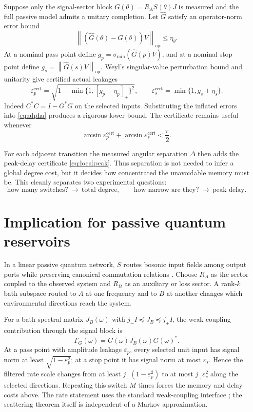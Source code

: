 \documentclass[11pt]{article}
\theoremstyle{definition}
\theoremstyle{remark}
\newcommand{\onorm}[1]{\left\lVert#1\right\rVert_{\mathrm{op}}}
\begin{document}
Suppose only the signal-sector block
$G(\theta)=R_AS(\theta)J$ is measured and the full passive model admits a
unitary completion.  Let $\widehat G$ satisfy an operator-norm error bound
\begin{equation}\label{eq:measurementerror}
 \onorm{(\widehat G(\theta)-G(\theta))V}\leq\eta_\theta.
\end{equation}
At a nominal pass point define
$g_p=\sigma_{\min}(\widehat G(p)V)$, and at a nominal stop point define
$g_s=\onorm{\widehat G(s)V}$.  Weyl's singular-value perturbation bound and
unitarity give certified actual leakages
\begin{equation}\label{eq:inflatederrors}
 \varepsilon_p^{\mathrm{cert}}
 =\sqrt{1-\min\{1,[g_p-\eta_p]_+\}^2},
 \qquad
 \varepsilon_s^{\mathrm{cert}}
 =\min\{1,g_s+\eta_s\}.
\end{equation}
Indeed $C^*C=I-G^*G$ on the selected inputs.  Substituting the inflated
errors into \eqref{eq:alpha} produces a rigorous lower bound.  The
certificate remains useful whenever
\[
 \arcsin\varepsilon_p^{\mathrm{cert}}
 +\arcsin\varepsilon_s^{\mathrm{cert}}<\frac{\pi}{2}.
\]

For each adjacent transition the measured angular separation $\Delta$ then
adds the peak-delay certificate \eqref{eq:localpeak}.  Thus separation is
not needed to infer a global degree cost, but it decides how concentrated
the unavoidable memory must be.  This cleanly separates two experimental
questions:
\[
 \text{how many switches?}\ \longrightarrow\ \text{total degree},
 \qquad
 \text{how narrow are they?}\ \longrightarrow\ \text{peak delay}.
\]

\section{Implication for passive quantum reservoirs}

In a linear passive quantum network, $S$ routes bosonic input fields among
output ports while preserving canonical commutation relations
\cite{GoughJames2009,GoughZhang2015}.  Choose $R_A$ as the sector coupled to
the observed system and $R_B$ as an auxiliary or loss sector.  A rank-$k$
bath subspace routed to $A$ at one frequency and to $B$ at another changes
which environmental directions reach the system.

For a bath spectral matrix $J_B(\omega)$ with
$j_-I\preceq J_B\preceq j_+I$, the weak-coupling contribution through the
signal block is
\begin{equation}\label{eq:kossakowski}
 \Gamma_G(\omega)=G(\omega)J_B(\omega)G(\omega)^*.
\end{equation}
At a pass point with amplitude leakage $\varepsilon_p$, every selected unit
input has signal norm at least $\sqrt{1-\varepsilon_p^2}$; at a stop point
it has signal norm at most $\varepsilon_s$.  Hence the filtered rate scale
changes from at least $j_-(1-\varepsilon_p^2)$ to at most
$j_+\varepsilon_s^2$ along the selected directions.  Repeating this switch
$M$ times forces the memory and delay costs above.  The rate statement uses
the standard weak-coupling interface \cite{Davies1974}; the scattering
theorem itself is independent of a Markov approximation.
\end{document}

